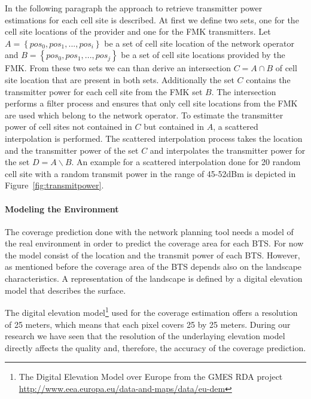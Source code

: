 \documentclass[twocolumn]{bmcart}%
\begin{document}
In the following paragraph the approach to retrieve transmitter power estimations for each cell site is described. At first we define two sets, one for the cell site locations of the provider and one for the FMK transmitters.
Let $A=\left\lbrace pos_0,pos_1,...,pos_i \right\rbrace $ be a set of cell site location of the network operator and $B=\left\lbrace pos_0,pos_1,...,pos_j \right\rbrace$ be a set of cell site locations provided by the FMK. From these two sets we can than derive an intersection $C=A \cap B$ of cell site location that are present in both sets. Additionally the set $C$ contains the transmitter power for each cell site from the FMK set $B$. The intersection performs a filter process and ensures that only cell site locations from the FMK are used which belong to the network operator. To estimate the transmitter power of cell sites not contained in $C$ but  contained in $A$, a scattered interpolation is performed. The scattered interpolation process takes the location and the transmitter power of the set $C$ and interpolates the transmitter power for the set $D=A \backslash B$.
An example for a scattered interpolation done for 20 random cell site with a random transmit power in the range of 45-52dBm is depicted in Figure~\ref{fig:transmitpower}.

\paragraph{Modeling the Environment}
The coverage prediction done with the network planning tool needs a model of the real environment in order to predict the coverage area for each BTS. For now the model consist of the location and the transmit power of each BTS. However, as mentioned before the coverage area of the BTS depends also on the landscape characteristics. A representation of the landscape is defined by a digital elevation model that describes the surface. 

The digital elevation model\footnote{The Digital Elevation Model over Europe from the GMES RDA project \url{http://www.eea.europa.eu/data-and-maps/data/eu-dem}} used for the coverage estimation offers a resolution of 25 meters, which means that each pixel covers 25 by 25 meters. During our research we have seen that the resolution of the underlaying elevation model directly affects the quality and, therefore, the accuracy of the coverage prediction.
\end{document}
